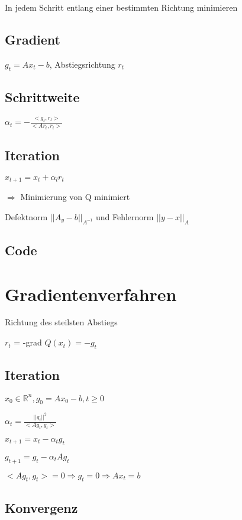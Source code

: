 \documentclass[12pt,a4paper]{article} %
\begin{document}
	In jedem Schritt entlang einer bestimmten Richtung minimieren
	
	\subsection{Gradient}
	
	$g_t = Ax_t - b$, Abstiegsrichtung $r_t$
	
	\subsection{Schrittweite}
	
	$\alpha_t = -\frac{<g_t, r_t>}{<Ar_t, r_t>}$
	
	\subsection{Iteration}
	
	$x_{t + 1} = x_t + \alpha_lr_t$
	
	$\Rightarrow$ Minimierung von Q minimiert 
	
	Defektnorm $||A_y - b||_{A^{-1}}$ und Fehlernorm $||y - x||_A$
	
	\subsection{Code}
	
	\newpage
	
	\section{Gradientenverfahren}
	
	Richtung des steilsten Abstiegs
	
	$r_t$ = -grad $Q(x_t) = -g_t$
	
	\subsection{Iteration}
	
	$x_0 \in \mathbb{R}^n, g_0 = Ax_0 - b, t \ge 0$
	
	$\alpha_t = \frac{||g_t||^2}{<Ag_t, g_t>}$
	
	$x_{t + 1} = x_t - \alpha_t g_t$
	
	$g_{t + 1} = g_t - \alpha_t Ag_t$
	
	$<Ag_t, g_t> = 0 \Rightarrow g_t = 0 \Rightarrow Ax_t = b$
	
	\subsection{Konvergenz}
	
\end{document}
